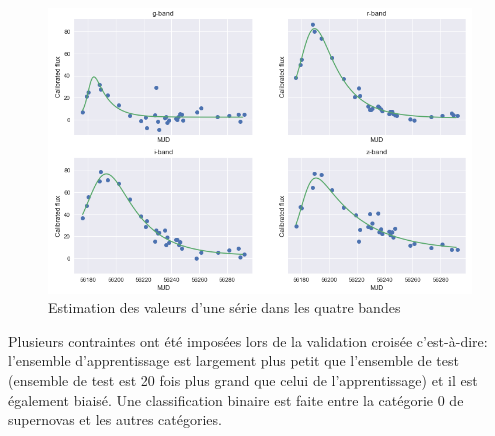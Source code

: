 \documentclass[french]{report}
\begin{document}
\begin{figure}[H]
	\centering
	\includegraphics[scale = 0.8]{images/calibre_light.PNG}
	\caption{Estimation des valeurs d'une série dans les quatre bandes}
\end{figure}

Plusieurs contraintes ont été imposées lors de la validation croisée c'est-à-dire: l'ensemble d'apprentissage est largement plus petit que l'ensemble de test (ensemble de test est 20 fois plus grand que celui de l'apprentissage) et il est également biaisé. Une classification binaire est faite entre la catégorie 0 de supernovas et les autres catégories. 

\end{document}
